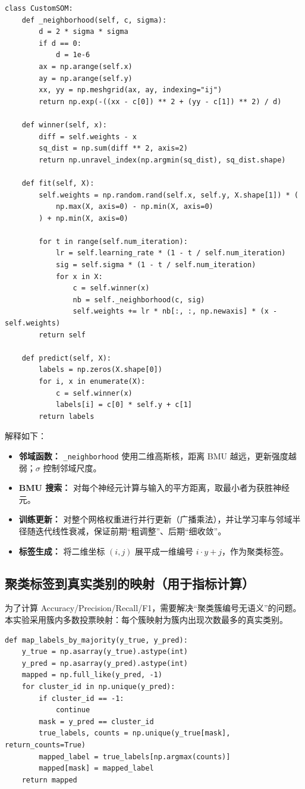 \documentclass[runningheads]{ctexart}
\begin{document}
\begin{lstlisting}
class CustomSOM:
	def _neighborhood(self, c, sigma):
		d = 2 * sigma * sigma
		if d == 0:
			d = 1e-6
		ax = np.arange(self.x)
		ay = np.arange(self.y)
		xx, yy = np.meshgrid(ax, ay, indexing="ij")
		return np.exp(-((xx - c[0]) ** 2 + (yy - c[1]) ** 2) / d)

	def winner(self, x):
		diff = self.weights - x
		sq_dist = np.sum(diff ** 2, axis=2)
		return np.unravel_index(np.argmin(sq_dist), sq_dist.shape)

	def fit(self, X):
		self.weights = np.random.rand(self.x, self.y, X.shape[1]) * (
			np.max(X, axis=0) - np.min(X, axis=0)
		) + np.min(X, axis=0)

		for t in range(self.num_iteration):
			lr = self.learning_rate * (1 - t / self.num_iteration)
			sig = self.sigma * (1 - t / self.num_iteration)
			for x in X:
				c = self.winner(x)
				nb = self._neighborhood(c, sig)
				self.weights += lr * nb[:, :, np.newaxis] * (x - self.weights)
		return self

	def predict(self, X):
		labels = np.zeros(X.shape[0])
		for i, x in enumerate(X):
			c = self.winner(x)
			labels[i] = c[0] * self.y + c[1]
		return labels
\end{lstlisting}

解释如下：
\begin{itemize}
	\item \textbf{邻域函数：} \texttt{\_neighborhood} 使用二维高斯核，距离 BMU 越远，更新强度越弱；$\sigma$ 控制邻域尺度。
	\item \textbf{BMU 搜索：} 对每个神经元计算与输入的平方距离，取最小者为获胜神经元。
	\item \textbf{训练更新：} 对整个网格权重进行并行更新（广播乘法），并让学习率与邻域半径随迭代线性衰减，保证前期“粗调整”、后期“细收敛”。
	\item \textbf{标签生成：} 将二维坐标 $(i,j)$ 展平成一维编号 $i\cdot y + j$，作为聚类标签。
\end{itemize}

\subsection{聚类标签到真实类别的映射（用于指标计算）}
为了计算 Accuracy/Precision/Recall/F1，需要解决“聚类簇编号无语义”的问题。本实验采用簇内多数投票映射：每个簇映射为簇内出现次数最多的真实类别。

\begin{lstlisting}
def map_labels_by_majority(y_true, y_pred):
	y_true = np.asarray(y_true).astype(int)
	y_pred = np.asarray(y_pred).astype(int)
	mapped = np.full_like(y_pred, -1)
	for cluster_id in np.unique(y_pred):
		if cluster_id == -1:
			continue
		mask = y_pred == cluster_id
		true_labels, counts = np.unique(y_true[mask], return_counts=True)
		mapped_label = true_labels[np.argmax(counts)]
		mapped[mask] = mapped_label
	return mapped
\end{lstlisting}
\end{document}
